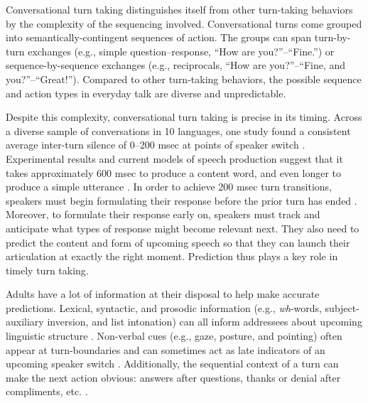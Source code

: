 \documentclass[authoryear, 12pt]{elsarticle}
\begin{document}
Conversational turn taking distinguishes itself from other turn-taking behaviors by the complexity of the sequencing involved. Conversational turns come grouped into semantically-contingent sequences of action. The groups can span turn-by-turn exchanges (e.g., simple question--response, ``How are you?''--``Fine.'') or sequence-by-sequence exchanges (e.g., reciprocals, ``How are you?''--``Fine, and you?''--``Great!''). Compared to other turn-taking behaviors, the possible sequence and action types in everyday talk are diverse and unpredictable.


Despite this complexity, conversational turn taking is precise in its timing. Across a diverse sample of conversations in 10 languages, one study found a consistent average inter-turn silence of 0--200 msec at points of speaker switch \citep{stivers2009}. Experimental results and current models of speech production suggest that it takes approximately 600 msec to produce a content word, and even longer to produce a simple utterance \citep{griffin2000, levelt1989}. In order to achieve 200 msec turn transitions, speakers must begin formulating their response before the prior turn has ended \citep{levinson2013, levinson2016}. Moreover, to formulate their response early on, speakers must track and anticipate what types of response might become relevant next. They also need to predict the content and form of upcoming speech so that they can launch their articulation at exactly the right moment. Prediction thus plays a key role in timely turn taking.

Adults have a lot of information at their disposal to help make accurate predictions. Lexical, syntactic, and prosodic information (e.g., \textit{wh}-words, subject-auxiliary inversion, and list intonation) can all inform addressees about upcoming linguistic structure \citep{de-ruiter2006, duncan1972, ford1996, bogelstorreira2015}. Non-verbal cues (e.g., gaze, posture, and pointing) often appear at turn-boundaries and can sometimes act as late indicators of an upcoming speaker switch \citep{rossano2009, stivers2010}. Additionally, the sequential context of a turn can make the next action obvious: answers after questions, thanks or denial after compliments, etc. \citep{schegloff2007}.
\end{document}
